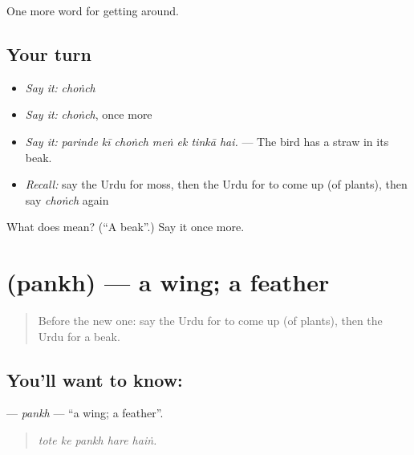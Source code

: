 \begin{grammarlens}[title={What you've built}]
One more word for getting around.
\end{grammarlens}

\subsection*{Your turn}
\begin{itemize}
\raggedright
  \item \emph{Say it:} \emph{choṅch}
  \item \emph{Say it:} \emph{choṅch}, once more
  \item \emph{Say it:} \emph{parinde kī choṅch meṅ ek tinkā hai.} — The bird has a straw in its beak.
  \item \emph{Recall:} say the Urdu for moss, then the Urdu for to come up (of plants), then say \emph{choṅch} again
\end{itemize}

\begin{tcolorbox}[breakable,colback=teal!4,colframe=teal!35!black,title={Before you move on}]
What does  mean? (\textquotedblleft{}A beak\textquotedblright{}.) Say it once more.
\end{tcolorbox}
\section[\texorpdfstring{\ur{پنکھ} (pankh)}{پنکھ (pankh)}]{ (pankh) — a wing; a feather}

\label{lesson:UR-C438-pankh}



\begin{quote}
Before the new one: say the Urdu for to come up (of plants), then the Urdu for a beak.
\end{quote}

\subsection*{You'll want to know: }
\textbf{} — \emph{pankh} — \textquotedblleft{}a wing; a feather\textquotedblright{}.

\begin{quote}
    
\end{quote}

\begin{quote}
\emph{tote ke pankh hare haiṅ.}
\end{quote}

